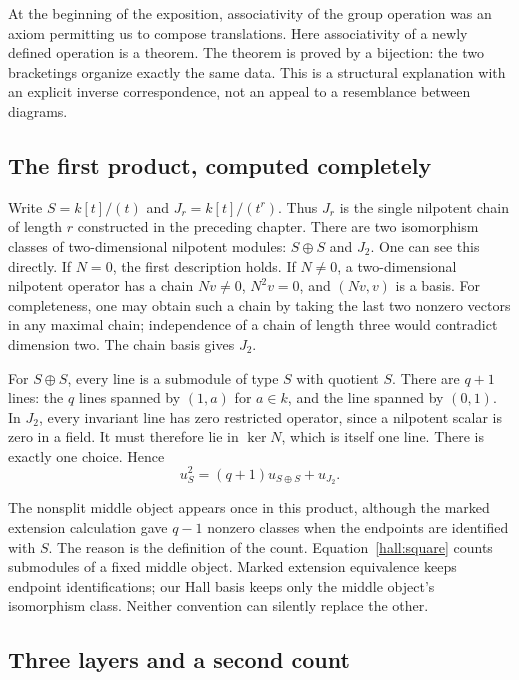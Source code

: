 \documentclass[11pt]{article}
\theoremstyle{definition}
\theoremstyle{remark}\newtheorem{remark}[theorem]{Remark}
\newcommand{\kk}{k}
\DeclareMathOperator{\Ker}{ker}
\begin{document}
At the beginning of the exposition, associativity of the group operation
was an axiom permitting us to compose translations. Here associativity
of a newly defined operation is a theorem. The theorem is proved by a
bijection: the two bracketings organize exactly the same data. This is
a structural explanation with an explicit inverse correspondence, not
an appeal to a resemblance between diagrams.

\subsection{The first product, computed completely}

Write $S=\kk[t]/(t)$ and $J_r=\kk[t]/(t^r)$. Thus $J_r$ is the single
nilpotent chain of length $r$ constructed in the preceding chapter.
There are two isomorphism classes of two-dimensional nilpotent modules:
$S\oplus S$ and $J_2$. One can see this directly. If $N=0$, the first
description holds. If $N\neq0$, a two-dimensional nilpotent operator has
a chain $Nv\neq0$, $N^2v=0$, and $(Nv,v)$ is a basis. For completeness,
one may obtain such a chain by taking the last two nonzero vectors in
any maximal chain; independence of a chain of length three would
contradict dimension two. The chain basis gives $J_2$.

For $S\oplus S$, every line is a submodule of type $S$ with quotient
$S$. There are $q+1$ lines: the $q$ lines spanned by $(1,a)$ for
$a\in\kk$, and the line spanned by $(0,1)$. In $J_2$, every invariant
line has zero restricted operator, since a nilpotent scalar is zero in
a field. It must therefore lie in $\Ker N$, which is itself one line.
There is exactly one choice. Hence
\begin{equation}\label{hall:square}
u_S^2=(q+1)u_{S\oplus S}+u_{J_2}.
\end{equation}

The nonsplit middle object appears once in this product, although the
marked extension calculation gave $q-1$ nonzero classes when the
endpoints are identified with $S$. The reason is the definition of the
count. Equation~\eqref{hall:square} counts submodules of a fixed middle
object. Marked extension equivalence keeps endpoint identifications;
our Hall basis keeps only the middle object's isomorphism class.
Neither convention can silently replace the other.

\subsection{Three layers and a second count}
\end{document}
